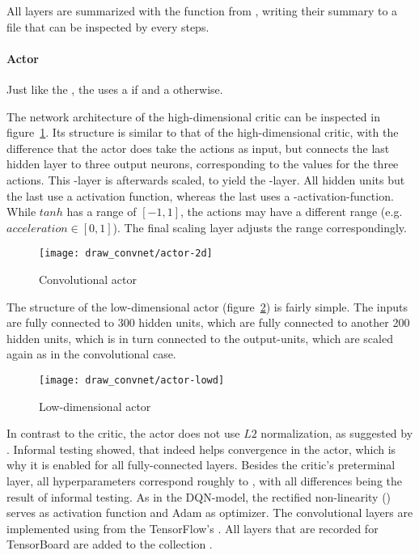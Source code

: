 All layers are summarized with the function  from , writing their summary to a file that can be inspected by  every  steps. 


\paragraph{Actor}

Just like the , the  uses a  if  and a  otherwise.

The network architecture of the high-dimensional critic can be inspected in figure~\ref{fig:2dact}. Its structure is similar to that of the high-dimensional critic, with the difference that the actor does take the actions as input, but connects the last hidden layer to three output neurons, corresponding to the values for the three actions. This -layer is afterwards scaled, to yield the -layer. All hidden units but the last use a  activation function, whereas the last uses a -activation-function. While $tanh$ has a range of $[-1,1]$, the actions may have a different range (e.g. $acceleration \in [0,1]$). The final scaling layer adjusts the range correspondingly.

\begin{figure}[h]
	\centering 
	\texttt{[image: draw\_convnet/actor-2d]}
	\caption{Convolutional actor}
	\label{fig:2dact}
\end{figure}

The structure of the low-dimensional actor (figure~\ref{fig:lowdact}) is fairly simple. The inputs are fully connected to 300 hidden units, which are fully connected to another 200 hidden units, which is in turn connected to the output-units, which are scaled again as in the convolutional case. 

\begin{figure}[h]
	\centering 
	\texttt{[image: draw\_convnet/actor-lowd]}
	\caption{Low-dimensional actor}
	\label{fig:lowdact}
\end{figure}

In contrast to the critic, the actor does not use $L2$ normalization, as suggested by \cite{lillicrap_continuous_2015}. Informal testing showed, that \batchnorm indeed helps convergence in the actor, which is why it is enabled for all fully-connected layers. Besides the critic's preterminal layer, all hyperparameters correspond roughly to \cite{lillicrap_continuous_2015}, with all differences being the result of informal testing. As in the DQN-model, the rectified non-linearity () serves as activation function and Adam\cite{kingma_adam:_2014} as optimizer. The convolutional layers are implemented using  from the TensorFlow's . All layers that are recorded for TensorBoard are added to the collection .

